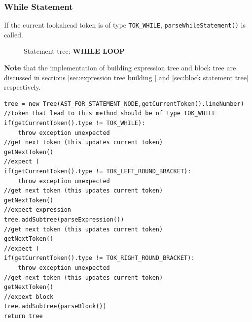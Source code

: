 \subsubsection{While Statement}
If the current lookahead token is of type \verb!TOK_WHILE!, \verb!parseWhileStatement()! is called. 
\begin{figure}[H]
	\centering
	\caption{Statement tree: \textbf{WHILE LOOP}}
	\label{fig:while statement tree}
\end{figure}
\textbf{Note } that the implementation of building  expression tree and block tree are discussed in sections \ref{sec:expression tree building } and \ref{sec:block statement tree}  respectively.
\begin{lstlisting}[caption=PSEUDOCODE for building a while statement subtree (\emph{parseWhileStatement()})]
tree = new Tree(AST_FOR_STATEMENT_NODE,getCurrentToken().lineNumber)
//token that lead to this method should be of type TOK_WHILE
if(getCurrentToken().type != TOK_WHILE):
    throw exception unexpected 
//get next token (this updates current token)
getNextToken()
//expect (
if(getCurrentToken().type != TOK_LEFT_ROUND_BRACKET):
    throw exception unexpected 
//get next token (this updates current token)
getNextToken()
//expect expression
tree.addSubtree(parseExpression())
//get next token (this updates current token)
getNextToken()
//expect )
if(getCurrentToken().type != TOK_RIGHT_ROUND_BRACKET):
    throw exception unexpected 
//get next token (this updates current token)
getNextToken()
//expext block 
tree.addSubtree(parseBlock())
return tree
\end{lstlisting}

